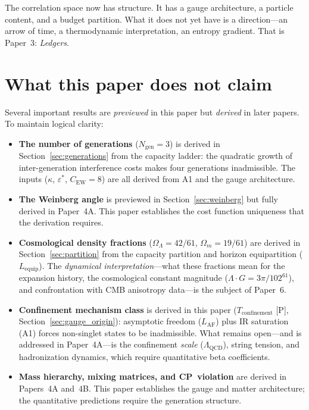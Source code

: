 \documentclass[11pt]{article}
\newenvironment{varlist}{\begin{itemize}[nosep,leftmargin=2em]}{\end{itemize}}
\begin{document}
The correlation space now has structure.  It has a gauge architecture, a particle content, and a budget partition.  What it does not yet have is a direction---an arrow of time, a thermodynamic interpretation, an entropy gradient.  That is Paper~3: \emph{Ledgers}.


\section{What this paper does not claim}
\label{sec:caveats}

Several important results are \emph{previewed} in this paper but \emph{derived} in later papers.  To maintain logical clarity:

\begin{varlist}
\item \textbf{The number of generations} ($N_{\mathrm{gen}} = 3$) is derived in Section~\ref{sec:generations} from the capacity ladder: the quadratic growth of inter-generation interference costs makes four generations inadmissible.  The inputs ($\kappa$, $\varepsilon^*$, $C_{\mathrm{EW}} = 8$) are all derived from A1 and the gauge architecture.
\item \textbf{The Weinberg angle} is previewed in Section~\ref{sec:weinberg} but fully derived in Paper~4A.  This paper establishes the cost function uniqueness that the derivation requires.
\item \textbf{Cosmological density fractions} ($\Omega_\Lambda = 42/61$, $\Omega_m = 19/61$) are derived in Section~\ref{sec:partition} from the capacity partition and horizon equipartition ($L_{\mathrm{equip}}$).  The \emph{dynamical interpretation}---what these fractions mean for the expansion history, the cosmological constant magnitude ($\Lambda \cdot G = 3\pi/102^{61}$), and confrontation with CMB anisotropy data---is the subject of Paper~6.
\item \textbf{Confinement mechanism class} is derived in this paper ($T_{\mathrm{confinement}}$ [P], Section~\ref{sec:gauge_origin}): asymptotic freedom ($L_{\mathrm{AF}}$) plus IR saturation (A1) forces non-singlet states to be inadmissible.  What remains open---and is addressed in Paper~4A---is the confinement \emph{scale} ($\Lambda_{\mathrm{QCD}}$), string tension, and hadronization dynamics, which require quantitative beta coefficients.
\item \textbf{Mass hierarchy, mixing matrices, and CP~violation} are derived in Papers~4A and~4B.  This paper establishes the gauge and matter architecture; the quantitative predictions require the generation structure.
\end{varlist}
\end{document}
